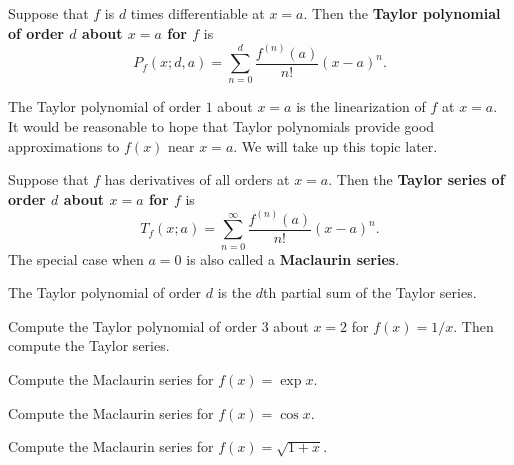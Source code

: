 

\begin{definition}
Suppose that $f$ is $d$ times differentiable at $x=a$.
Then the \textbf{Taylor polynomial of order $d$ about $x=a$ for $f$} is
\begin{equation*}
P_f(x; d, a) = \sum_{n=0}^d\frac{f^{(n)}(a)}{n!}(x-a)^n.
\end{equation*}
\end{definition}
\begin{remark}
The Taylor polynomial of order $1$ about $x=a$ is the linearization of $f$ at $x=a$.
It would be reasonable to hope that Taylor polynomials provide good approximations to $f(x)$ near $x=a$.
We will take up this topic later.
\end{remark}

\vfill 

\begin{definition}
Suppose that $f$ has derivatives of all orders at $x=a$.
Then the \textbf{Taylor series of order $d$ about $x=a$ for $f$} is
\begin{equation*}
T_f(x; a) = \sum_{n=0}^\infty \frac{f^{(n)}(a)}{n!}(x-a)^n.
\end{equation*}
The special case when $a=0$ is also called a \textbf{Maclaurin series}.
\end{definition}

\begin{remark}
The Taylor polynomial of order $d$ is the $d$th partial sum of the Taylor series.
\end{remark}

\vfill

\newpage

\begin{example}
Compute the Taylor polynomial of order $3$ about $x=2$ for $f(x) = 1/x$.
Then compute the Taylor series.
\end{example}

\newpage

\begin{example}
Compute the Maclaurin series for $f(x) = \exp x$.
\end{example}

\newpage

\begin{example}
Compute the Maclaurin series for $f(x) = \cos x$.
\end{example}

\newpage

\begin{example}
Compute the Maclaurin series for $f(x) =\sqrt{1+x}$.
\end{example}
